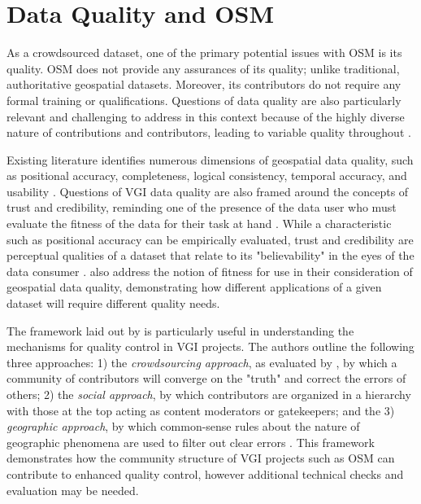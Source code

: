 \section{Data Quality and OSM}

As a crowdsourced dataset, one of the primary potential issues with OSM is its quality. OSM does not provide any assurances of its quality; unlike traditional, authoritative geospatial datasets. Moreover, its contributors do not require any formal training or qualifications. Questions of data quality are also particularly relevant and challenging to address in this context because of the highly diverse nature of contributions and contributors, leading to variable quality throughout  \parencite{girres_quality_2010, grochenig_digging_2014, haklay_how_2010, neis_analyzing_2012}. 

Existing literature identifies numerous dimensions of geospatial data quality, such as positional accuracy, completeness, logical consistency, temporal accuracy, and usability \parencite{antoniou_measures_2015, fox_notion_1994, van_oort_spatial_2006}. Questions of VGI data quality are also framed around the concepts of trust and credibility, reminding one of the presence of the data user who must evaluate the fitness of the data for their task at hand \parencite{flanagin_credibility_2008, severinsen_vgtrust_2019}. While a characteristic such as positional accuracy can be empirically evaluated, trust and credibility are perceptual qualities of a dataset that relate to its "believability" in the eyes of the data consumer \parencite{flanagin_credibility_2008}. \textcite{barron_comprehensive_2014} also address the notion of fitness for use in their consideration of geospatial data quality, demonstrating how different applications of a given dataset will require different quality needs. 

The framework laid out by \textcite{goodchild_assuring_2012} is particularly useful in understanding the mechanisms for quality control in VGI projects. The authors outline the following three approaches: 1) the \textit{crowdsourcing approach}, as evaluated by \textcite{haklay_how_2010-1}, by which a community of contributors will converge on the "truth" and correct the errors of others; 2) the \textit{social approach}, by which contributors are organized in a hierarchy with those at the top acting as content moderators or gatekeepers; and the 3) \textit{geographic approach}, by which common-sense rules about the nature of geographic phenomena are used to filter out clear errors \parencite{goodchild_assuring_2012}. This framework demonstrates how the community structure of VGI projects such as OSM can contribute to enhanced quality control, however additional technical checks and evaluation may be needed.

